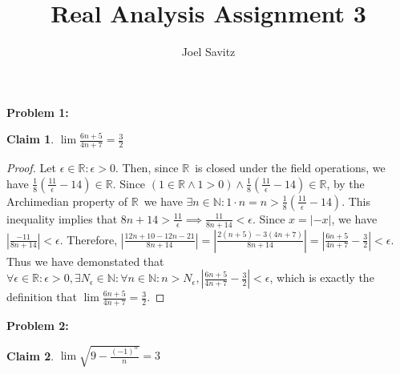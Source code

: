 \documentclass{article}
\title{Real Analysis Assignment 3}
\author{Joel Savitz}
\newcommand{\reals}{\ensuremath{\mathbb{R}}}
\newcommand{\nats}{\ensuremath{\mathbb{N}}}
\newcommand{\eps}{\ensuremath{\epsilon}}
\newcommand{\neps}{\ensuremath{N_\epsilon}}
\newtheorem{clm}{Claim}
\begin{document}
\maketitle

\textbf{Problem 1:}

\begin{clm} \label{c1}
	$\lim \frac{6n+5}{4n+7} = \frac{3}{2}$
\end{clm}

\begin{proof}
	Let $\eps \in \reals : \eps > 0$.
	Then, since \reals\ is closed under the field operations,
	we have $\frac{1}{8}(\frac{11}{\eps} - 14) \in \reals$.
	Since $(1 \in \reals \land 1 > 0) \land \frac{1}{8}(\frac{11}{\eps} - 14) \in \reals$,
	by the Archimedian property of \reals\,
	we have $\exists n \in \nats: 1 \cdot n = n > \frac{1}{8}(\frac{11}{\eps} - 14)$.
	This inequality implies that $8n + 14 > \frac{11}{\eps} \implies \frac{11}{8n+14} < \eps$.
	Since $x = |-x|$, we have $|\frac{-11}{8n+14}| < \eps$.
	Therefore, $|\frac{12n + 10 - 12n - 21}{8n+14}| = |\frac{2(n+5) - 3(4n+7)}{8n+14}| =
	|\frac{6n+5}{4n+7} - \frac{3}{2}| < \eps$.
	Thus we have demonstated that $\forall \eps \in \reals : \eps > 0, \exists \neps \in \nats:
	\forall n \in \nats: n > \neps, |\frac{6n+5}{4n+7} - \frac{3}{2}| < \eps$,
	which is exactly the definition that
	$\lim \frac{6n+5}{4n+7} = \frac{3}{2}$.
\end{proof}

\textbf{Problem 2:}

\begin{clm} \label{c2}
	$\lim \sqrt{9-\frac{(-1)^n}{n}} = 3$
\end{clm}
\end{document}
